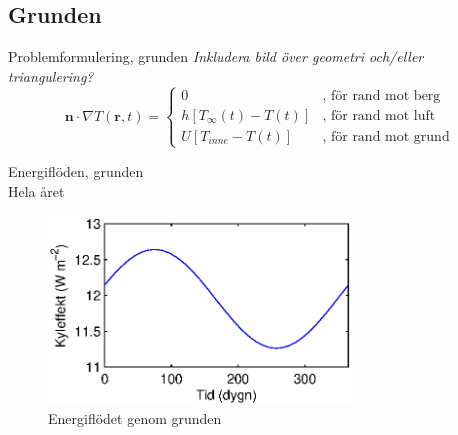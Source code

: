 \subsection{Grunden}

\begin{frame}{Problemformulering, grunden}
\emph{\color{red} Inkludera bild över geometri och/eller triangulering?}
\begin{equation*}
\mathbf{n}\cdot\nabla T(\mathbf{r},t) = 
\begin{cases}
0&\mbox{, för rand mot berg} \\
h[T_\infty(t)-T(t)]&\mbox{, för rand mot luft} \\
U[T_{inne} - T(t)]&\mbox{, för rand mot grund}
\end{cases}
\end{equation*}
\end{frame}

\begin{frame}{Energiflöden, grunden\\Hela året}

\begin{figure}[hpbt]
\centering
\includegraphics[height=5cm]{images/foundation.eps}
\caption*{Energiflödet genom grunden}
\end{figure}

\end{frame}
